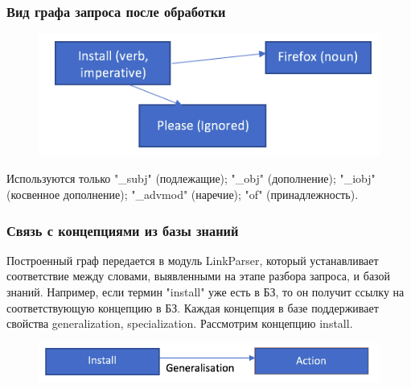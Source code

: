 \documentclass[14pt]{beamer}
\begin{document}
\begin{frame}
\frametitle{Вид графа запроса после обработки}
\begin{figure} [h] 
  \center
  \includegraphics [scale=0.5] {LexicalGraph2}
  \label{img:LexicalGraph2}  
\end{figure}
Используются только "\_subj" (подлежащие); "\_obj" (дополнение); "\_iobj" (косвенное дополнение); "\_advmod" (наречие); "of" (принадлежность).
\end{frame}



\begin{frame}
\frametitle{Связь с концепциями из базы знаний}
Построенный граф передается в модуль LinkParser, который устанавливает соответствие между словами, выявленными на этапе разбора запроса, и базой знаний. Например, если термин "install" уже есть в БЗ, то он получит ссылку на соответствующую концепцию в БЗ. Каждая концепция в базе поддерживает свойства generalization, specialization. Рассмотрим концепцию install.
\begin{figure} [h] 
  \center
  \includegraphics [scale=0.5] {Generalisation1}
  \label{img:Generalisation1}  
\end{figure}
\end{frame}


\end{document}
